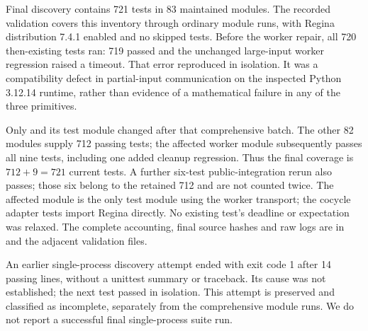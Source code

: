 Final discovery contains 721 tests in 83 maintained modules. The recorded
validation covers this inventory through ordinary  module
runs, with Regina distribution 7.4.1 enabled and no skipped tests. Before
the worker repair, all 720 then-existing tests ran: 719 passed and the
unchanged large-input worker regression raised a timeout. That error
reproduced in isolation. It was a compatibility defect in partial-input
communication on the inspected Python 3.12.14 runtime, rather than evidence
of a mathematical failure in any of the three primitives.

Only  and its test module changed after
that comprehensive batch. The other 82 modules supply 712 passing tests;
the affected worker module subsequently passes all nine tests, including
one added cleanup regression. Thus the final coverage is
$712+9=721$ current tests. A further six-test public-integration rerun also
passes; those six belong to the retained 712 and are not counted twice.
The affected module is the only test module using the worker transport;
the cocycle adapter tests import Regina directly. No existing test's
deadline or expectation was relaxed. The complete accounting, final source
hashes and raw logs are in  and the
adjacent validation files.

An earlier single-process discovery attempt ended with exit code 1 after
14 passing lines, without a unittest summary or traceback. Its cause was
not established; the next test passed in isolation. This attempt is
preserved and classified as incomplete, separately from the comprehensive
module runs. We do not report a successful final single-process suite run.
